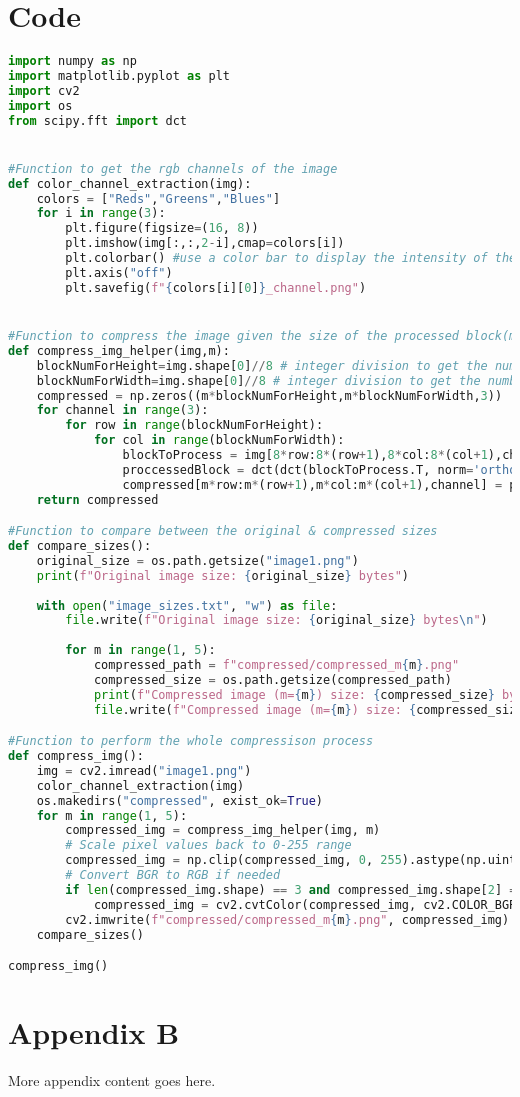 \documentclass{report}
\begin{document}
\section{Code}
\begin{lstlisting}[language=Python, caption=extract rgb components,label=lst:code]
import numpy as np
import matplotlib.pyplot as plt
import cv2
import os
from scipy.fft import dct


#Function to get the rgb channels of the image 
def color_channel_extraction(img):
    colors = ["Reds","Greens","Blues"]
    for i in range(3):
        plt.figure(figsize=(16, 8))
        plt.imshow(img[:,:,2-i],cmap=colors[i])
        plt.colorbar() #use a color bar to display the intensity of the channel
        plt.axis("off")
        plt.savefig(f"{colors[i][0]}_channel.png")


#Function to compress the image given the size of the processed block(m)
def compress_img_helper(img,m):
    blockNumForHeight=img.shape[0]//8 # integer division to get the number of 8*8 blocks that can fit in the height of the img
    blockNumForWidth=img.shape[0]//8 # integer division to get the number of 8*8 blocks that can fit in the height of the img
    compressed = np.zeros((m*blockNumForHeight,m*blockNumForWidth,3))
    for channel in range(3):
        for row in range(blockNumForHeight):
            for col in range(blockNumForWidth):
                blockToProcess = img[8*row:8*(row+1),8*col:8*(col+1),channel]
                proccessedBlock = dct(dct(blockToProcess.T, norm='ortho').T, norm='ortho') #2d DCT
                compressed[m*row:m*(row+1),m*col:m*(col+1),channel] = proccessedBlock[:m,:m]
    return compressed

#Function to compare between the original & compressed sizes
def compare_sizes():
    original_size = os.path.getsize("image1.png")
    print(f"Original image size: {original_size} bytes")
    
    with open("image_sizes.txt", "w") as file:
        file.write(f"Original image size: {original_size} bytes\n")
        
        for m in range(1, 5):
            compressed_path = f"compressed/compressed_m{m}.png"
            compressed_size = os.path.getsize(compressed_path)
            print(f"Compressed image (m={m}) size: {compressed_size} bytes")
            file.write(f"Compressed image (m={m}) size: {compressed_size} bytes\n")

#Function to perform the whole compressison process 
def compress_img():
    img = cv2.imread("image1.png")
    color_channel_extraction(img)
    os.makedirs("compressed", exist_ok=True)
    for m in range(1, 5):
        compressed_img = compress_img_helper(img, m)
        # Scale pixel values back to 0-255 range
        compressed_img = np.clip(compressed_img, 0, 255).astype(np.uint8)
        # Convert BGR to RGB if needed
        if len(compressed_img.shape) == 3 and compressed_img.shape[2] == 3:
            compressed_img = cv2.cvtColor(compressed_img, cv2.COLOR_BGR2RGB)
        cv2.imwrite(f"compressed/compressed_m{m}.png", compressed_img)  # Save the compressed image
    compare_sizes()

compress_img()
\end{lstlisting}
\section{Appendix B}
More appendix content goes here.


\end{document}
